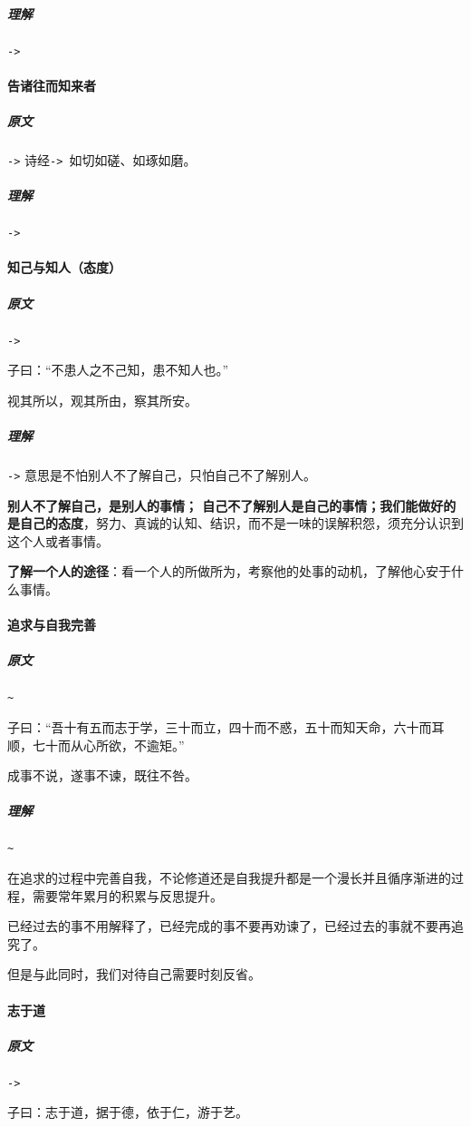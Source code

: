 \documentclass[UTF8,a4paper,8pt]{ctexbook}
\begin{document}
			\subparagraph{理解}\verb|->|
		
		\paragraph{告诸往而知来者}
			\subparagraph{原文}\verb|->|
				诗经\verb|-> |如切如磋、如琢如磨。
			
			\subparagraph{理解}\verb|->|
			
		\paragraph{知己与知人（态度）}
			\subparagraph{原文}\verb|->|
			
				子曰：“不患人之不己知，患不知人也。”
			
				视其所以，观其所由，察其所安。
			
			\subparagraph{理解}\verb|->|
				意思是不怕别人不了解自己，只怕自己不了解别人。
	
				\textbf{别人不了解自己，是别人的事情； 自己不了解别人是自己的事情；我们能做好的是自己的态度}，努力、真诚的认知、结识，而不是一味的误解积怨，须充分认识到这个人或者事情。
		
				\textbf{了解一个人的途径}：看一个人的所做所为，考察他的处事的动机，了解他心安于什么事情。
				
		\paragraph{追求与自我完善}
			\subparagraph{原文}\verb|~|
			
				子曰：“吾十有五而志于学，三十而立，四十而不惑，五十而知天命，六十而耳顺，七十而从心所欲，不逾矩。”
				
				成事不说，遂事不谏，既往不咎。
				
			\subparagraph{理解}\verb|~|
			
				在追求的过程中完善自我，不论修道还是自我提升都是一个漫长并且循序渐进的过程，需要常年累月的积累与反思提升。
				
				已经过去的事不用解释了，已经完成的事不要再劝谏了，已经过去的事就不要再追究了。
				
				但是与此同时，我们对待自己需要时刻反省。
		
		\paragraph{志于道}
			\subparagraph{原文}\verb|->|
				
				子曰：志于道，据于德，依于仁，游于艺。
				
\end{document}
